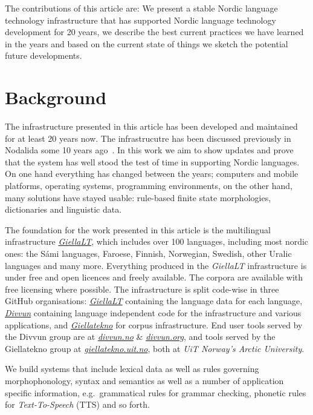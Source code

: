 \documentclass[free]{flammie}
\begin{document}
The contributions of this article are: We present a stable Nordic language
technology infrastructure that has supported Nordic language technology
development for 20 years, we describe the best current practices we have learned
in the years and based on the current state of things we sketch the potential
future developments.

\section{Background}\label{sec:background}

The infrastructure presented in this article has been developed and maintained
for at least 20 years now.  The infrastrucutre has been discussed previously in
Nodalida some 10 years ago~\cite{moshagen2013building}.  In this work we aim
to show updates and prove that the system has well stood the test of time in
supporting Nordic languages.  On one hand everything has changed between the
years; computers and mobile platforms, operating systems, programming
environments, on the other hand, many solutions have stayed usable: rule-based
finite state morphologies, dictionaries and linguistic data.





The foundation for the work presented in this article is the multilingual
infrastructure \textit{\href{https://github.com/giellalt}{GiellaLT}}, which
includes over 100 languages, including most nordic ones: the Sámi languages,
Faroese, Finnish, Norwegian, Swedish, other Uralic languages and many more.
Everything produced in the \textit{GiellaLT} infrastructure is under free and
open licences and freely available.  The corpora are available with free
licensing where possible.  The infrastructure is split code-wise in three GitHub
organisations: \textit{\href{https://github.com/giellalt}{GiellaLT}} containing
the language data for each language,
\textit{\href{https://github.com/divvun}{Divvun}} containing language
independent code for the infrastructure and various applications, and
\textit{\href{https://github.com/giellatekno}{Giellatekno}} for corpus
infrastructure.  End user tools served by the Divvun group are at
\textit{\href{https://divvun.no}{divvun.no}} \&
\textit{\href{https://divvun.org}{divvun.org}}, and tools served by the
Giellatekno group at
\textit{\href{https://giellatekno.uit.no}{giellatekno.uit.no}}, both at
\textit{UiT Norway's Arctic University}.

We build systems that include lexical data as well as rules governing
morphophonology, syntax and semantics as well as a number of application
specific information, e.g.\ grammatical rules for grammar checking, phonetic
rules for \textit{Text-To-Speech} (TTS) and so forth.
\end{document}
